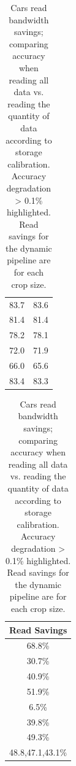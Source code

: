 \begin{table}[t]
\begin{tabular}{|c|c|}
    83.7 & 83.6 \\ 
    81.4 & 81.4 \\ 
    78.2 & 78.1 \\ 
    72.0 & 71.9 \\ 
    66.0 & {\color{red}65.6} \\
    83.4 & 83.3 \\ 
    \end{tabular}
    \begin{tabular}{|c}
    \\
    Read Savings \\
    \hline
    68.8\%\\ 
    30.7\%\\ 
    40.9\%\\ 
    51.9\%\\ 
    6.5\%\\ 
    39.8\%\\ 
    49.3\% \\
    48.8,47.1,43.1\%\\ 
    \end{tabular}
    \caption{Cars read bandwidth savings; comparing accuracy when reading all data vs. reading the quantity of data according to storage calibration. Accuracy degradation > 0.1\% highlighted.
    Read savings for the dynamic pipeline are for each crop size.
    }
    \label{tab:cars_storage}
\end{table}

